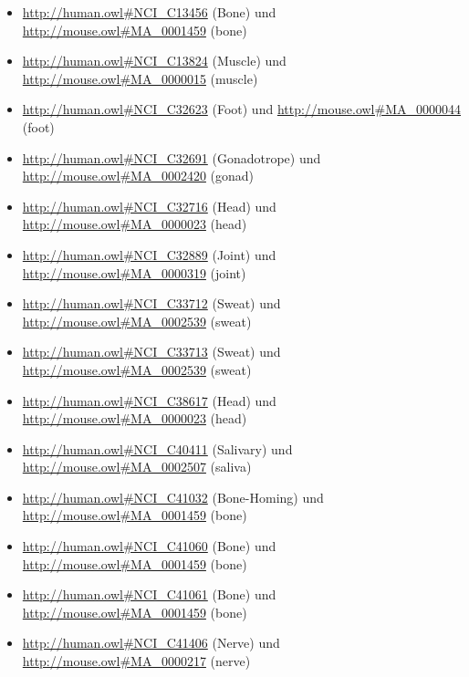 \begin{itemize}
\item \url{http://human.owl#NCI_C13456} (Bone\textunderscoreMarrow\textunderscoreStem\textunderscoreCell) und \url{http://mouse.owl#MA_0001459} (bone)
\item \url{http://human.owl#NCI_C13824} (Muscle\textunderscoreSpindle) und \url{http://mouse.owl#MA_0000015} (muscle)
\item \url{http://human.owl#NCI_C32623} (Foot\textunderscoreProcess) und \url{http://mouse.owl#MA_0000044} (foot)
\item \url{http://human.owl#NCI_C32691} (Gonadotrope\textunderscoreCell) und \url{http://mouse.owl#MA_0002420} (gonad)
\item \url{http://human.owl#NCI_C32716} (Head\textunderscoreund\textunderscoreNeck\textunderscoreMuscle) und \url{http://mouse.owl#MA_0000023} (head)
\item \url{http://human.owl#NCI_C32889} (Joint\textunderscoreBy\textunderscoreSite) und \url{http://mouse.owl#MA_0000319} (joint)
\item \url{http://human.owl#NCI_C33712} (Sweat\textunderscoreGlund) und \url{http://mouse.owl#MA_0002539} (sweat)
\item \url{http://human.owl#NCI_C33713} (Sweat\textunderscoreGlund\textunderscoreDuct) und \url{http://mouse.owl#MA_0002539} (sweat)
\item \url{http://human.owl#NCI_C38617} (Head\textunderscoreund\textunderscoreNeck\textunderscorePart) und \url{http://mouse.owl#MA_0000023} (head)
\item \url{http://human.owl#NCI_C40411} (Salivary\textunderscoreGlund\textunderscoreMyoepithelial\textunderscoreCell) und \url{http://mouse.owl#MA_0002507} (saliva)
\item \url{http://human.owl#NCI_C41032} (Bone\textunderscoreMarrow-Homing\textunderscorePlasma\textunderscoreCell) und \url{http://mouse.owl#MA_0001459} (bone)
\item \url{http://human.owl#NCI_C41060} (Bone\textunderscoreMarrow\textunderscoreMyeloid\textunderscoreStem\textunderscoreCell\textunderscorewith\textunderscorePredominant\textunderscoreNeutrophil\textunderscoreDifferentiation) und \url{http://mouse.owl#MA_0001459} (bone)
\item \url{http://human.owl#NCI_C41061} (Bone\textunderscoreMarrow\textunderscoreStem\textunderscoreCell\textunderscoreat\textunderscorethe\textunderscoreEarliest\textunderscoreStage\textunderscoreof\textunderscoreMyeloid\textunderscoreDifferentiation) und \url{http://mouse.owl#MA_0001459} (bone)
\item \url{http://human.owl#NCI_C41406} (Nerve\textunderscoreund\textunderscorePerineural\textunderscoreTissue) und \url{http://mouse.owl#MA_0000217} (nerve)

\end{itemize}
